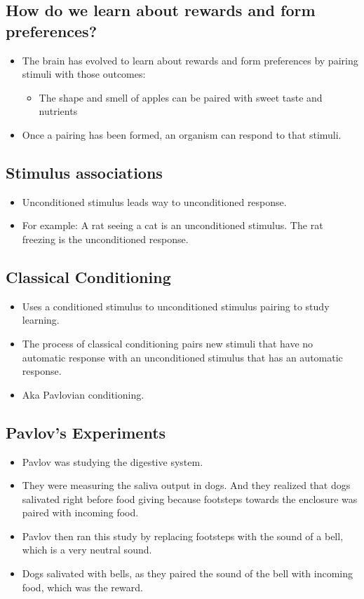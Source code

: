 \subsection{How do we learn about rewards and form preferences?}
\begin{itemize}
    \item The brain has evolved to learn about rewards and form preferences by pairing stimuli with those outcomes:
    \begin{itemize}
        \item The shape and smell of apples can be paired with sweet taste and nutrients
    \end{itemize}
    \item Once a pairing has been formed, an organism can respond to that stimuli.
\end{itemize}

\subsection{Stimulus associations}
\begin{itemize}
    \item Unconditioned stimulus leads way to unconditioned response.
    \item For example: A rat seeing a cat is an unconditioned stimulus. The rat freezing is the unconditioned response.
\end{itemize}

\subsection{Classical Conditioning}
\begin{itemize}
    \item Uses a conditioned stimulus to unconditioned stimulus pairing to study learning.
    \item The process of classical conditioning pairs new stimuli that have no automatic response with an unconditioned stimulus that has an automatic response.
    \item Aka Pavlovian conditioning.
\end{itemize}

\subsection{Pavlov's Experiments}
\begin{itemize}
    \item Pavlov was studying the digestive system. 
    \item They were measuring the saliva output in dogs. And they realized that dogs salivated right before food giving because footsteps towards the enclosure was paired with incoming food.
    \item Pavlov then ran this study by replacing footsteps with the sound of a bell, which is a very neutral sound.
    \item Dogs salivated with bells, as they paired the sound of the bell with incoming food, which was the reward.
\end{itemize}

